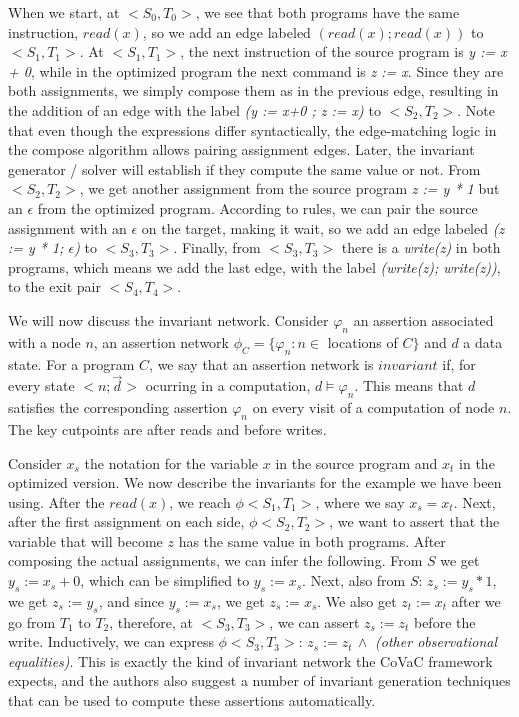 When we start, at $<S_0, T_0>$, we see that both programs have the same instruction, $read(x)$, so we add an edge labeled $(read(x); read(x))$ to $<S_1, T_1>$.
At $<S_1, T_1>$, the next instruction of the source program is \emph{y := x + 0}, while in the optimized program the next command is \emph{z := x}.
Since they are both assignments, we simply compose them as in the previous edge, resulting in the addition of an edge with the label \emph{(y := x+0 ; z := x)} to $<S_2, T_2>$.
Note that even though the expressions differ syntactically, the edge-matching logic in the compose algorithm allows pairing assignment edges.
Later, the invariant generator / solver will establish if they compute the same value or not.
From $<S_2, T_2>$, we get another assignment from the source program \emph{z := y * 1} but an $\epsilon$ from the optimized program.
According to rules, we can pair the source assignment with an $\epsilon$ on the target, making it wait, so we add an edge labeled \emph{(z := y * 1; $\epsilon$)} to $<S_3, T_3>$.
Finally, from $<S_3, T_3>$ there is a \emph{write(z)} in both programs, which means we add the last edge, with the label \emph{(write(z); write(z))}, to the exit pair $<S_4, T_4>$.

We will now discuss the invariant network.
Consider $\varphi_n$ an assertion associated with a node $n$, an assertion network $\phi_C = \{ \varphi_n : n \in$ locations of $C \}$ and $d$ a data state.
For a program $C$, we say that an assertion network is $invariant$ if, for every state $<n;\overrightarrow{d}>$ ocurring in a computation, $d \vDash \varphi_n$.
This means that $d$ satisfies the corresponding assertion $\varphi_n$ on every visit of a computation of node $n$. 
The key cutpoints are after reads and before writes.

Consider $x_s$ the notation for the variable $x$ in the source program and $x_t$ in the optimized version.
We now describe the invariants for the example we have been using.
After the $read(x)$, we reach $\phi<S_1, T_1>$, where we say $x_s = x_t$.
Next, after the first assignment on each side, $\phi<S_2, T_2>$, we want to assert that the variable that will become $z$ has the same value in both programs.
After composing the actual assignments, we can infer the following.
From $S$ we get $y_s := x_s + 0$, which can be simplified to $y_s := x_s$.
Next, also from $S$: $z_s := y_s * 1$, we get $z_s := y_s$, and since $y_s := x_s$, we get $z_s := x_s$.
We also get $z_t := x_t$ after we go from $T_1$ to $T_2$, therefore, at $<S_3, T_3>$, we can assert $z_s := z_t$ before the write.
Inductively, we can express $\phi<S_3, T_3> : \, z_s := z_t \, \land$ \emph{(other observational equalities)}.
This is exactly the kind of invariant network the CoVaC framework expects, and the authors also suggest a number of invariant generation techniques that can be used to compute these assertions automatically.

